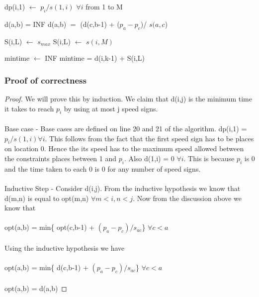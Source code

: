 \documentclass[12pt]{article}
\newcommand*\Let[2]{\State #1 $\gets$ #2}
\begin{document}
\begin{algorithm}[H]
\begin{algorithmic}[1]
		\Let {dp(i,1)}{$p_i / s(1,i)$} $\forall i$ from 1 to M  
		
				\State d(a,b) = INF
					\State d(a,b) $=$ (d(c,b-1) + ($p_a - p_c$)/ $s(a,c$)
					\EndIf
				\EndFor
			\EndFor
		\EndFor
		
		\Let {S(i,L)}{$s_{max}$}
			\State S(i,L) $\gets$ {$s(i,M)$}
		\EndFor
		
		\Let{mintime}{INF}
				\State mintime  = d(i,k-1) + S(i,L)
			\EndIf
		\EndFor
		\State {}
	\EndProcedure
  \end{algorithmic}
\end{algorithm}
\subsubsection{Proof of correctness}
\begin{proof}

We will prove this by induction. We claim that d(i,j) is the minimum time it takes to reach $p_i$ by using at most j speed signs. 
\\\\
Base case -
Base cases are defined on line 20 and 21 of the algorithm. dp(i,1) = $p_i / s(1,i) \forall i$. This follows from the fact that the first speed sign has to be places on location 0. Hence the its speed has to the maximum speed allowed between the constraints places between 1 and $p_i$. Also d(1,i) = 0 $\forall i$. This is because $p_i$ is 0 and the time taken to each 0 is 0 for any number of speed signs.
\\\\
Inductive Step  - 
Consider d(i,j). From the inductive hypothesis we know that d(m,n) is equal to opt(m,n) $\forall m < i , n<j$. Now from the discussion above we know that \\\\
opt(a,b) = min\{ opt(c,b-1) + $(p_a - p_c)/s_{ac}$\} $\forall c < a $\\\\
Using the inductive hypothesis we have\\\\
opt(a,b) = min\{ d(c,b-1) + $(p_a - p_c)/s_{ac}$\} $\forall c < a $\\\\
opt(a,b) = d(a,b)
\end{proof}
\end{document}
